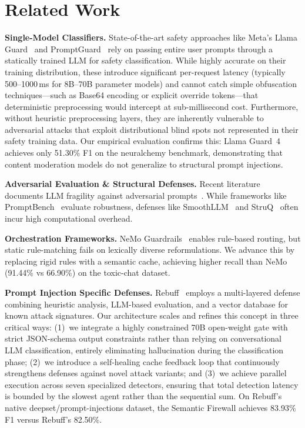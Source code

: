 \documentclass[conference]{IEEEtran}
\begin{document}
\section{Related Work}

\textbf{Single-Model Classifiers.} State-of-the-art safety approaches
like Meta's Llama Guard~\cite{llamaguard} and
PromptGuard~\cite{promptguard} rely on passing entire user prompts
through a statically trained LLM for safety classification. While
highly accurate on their training distribution, these introduce
significant per-request latency (typically 500--1000\,ms for 8B--70B
parameter models) and cannot catch simple obfuscation techniques---such
as Base64 encoding or explicit override tokens---that deterministic
preprocessing would intercept at sub-millisecond cost. Furthermore,
without heuristic preprocessing layers, they are inherently vulnerable
to adversarial attacks that exploit distributional blind spots not
represented in their safety training data. Our empirical evaluation
confirms this: Llama Guard~4 achieves only 51.30\% F1 on the
neuralchemy benchmark, demonstrating that content moderation models do
not generalize to structural prompt injections.

\textbf{Adversarial Evaluation \& Structural Defenses.} Recent literature documents LLM fragility against adversarial prompts~\cite{surveyprompt,autodan,pair}. While frameworks like PromptBench~\cite{promptbench} evaluate robustness, defenses like SmoothLLM~\cite{smoothllm} and StruQ~\cite{struq} often incur high computational overhead.

\textbf{Orchestration Frameworks.} NeMo Guardrails~\cite{nemoguardrails} enables rule-based routing, but static rule-matching fails on lexically diverse reformulations. We advance this by replacing rigid rules with a semantic cache, achieving higher recall than NeMo (91.44\% vs 66.90\%) on the toxic-chat dataset.

\textbf{Prompt Injection Specific Defenses.} Rebuff~\cite{rebuff}
employs a multi-layered defense combining heuristic analysis, LLM-based
evaluation, and a vector database for known attack signatures. Our
architecture scales and refines this concept in three critical ways:
(1)~we integrate a highly constrained 70B open-weight gate with strict
JSON-schema output constraints rather than relying on conversational
LLM classification, entirely eliminating hallucination during the
classification phase; (2)~we introduce a self-healing cache feedback
loop that continuously strengthens defenses against novel attack
variants; and (3)~we achieve parallel execution across seven
specialized detectors, ensuring that total detection latency is bounded
by the slowest agent rather than the sequential sum. On Rebuff's
native deepset/prompt-injections dataset, the Semantic Firewall
achieves 83.93\% F1 versus Rebuff's 82.50\%.
\end{document}
